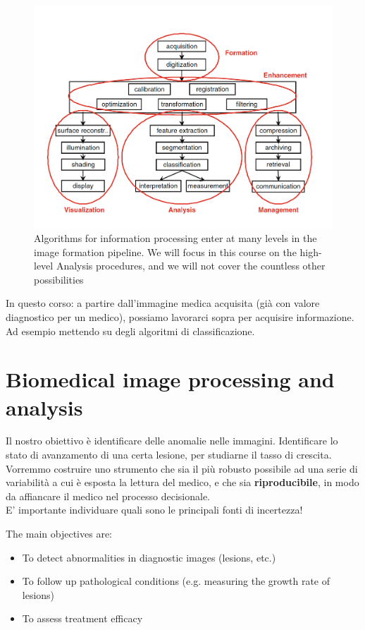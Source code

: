 \begin{figure}[ht]
	\centering
	\includegraphics[width=0.85\linewidth]{figure_med/computers_med_img}
	\caption{Algorithms for
		information processing enter at many levels in the image formation	pipeline. We will focus in this
		course on the high-level Analysis procedures, and
		we will not cover the countless other possibilities}
\end{figure}
\FloatBarrier
In questo corso: a partire dall'immagine medica acquisita (già con valore diagnostico per un medico), possiamo lavorarci sopra per acquisire informazione. Ad esempio mettendo su degli algoritmi di classificazione.\\

\section{Biomedical image processing and analysis}

Il nostro obiettivo è identificare delle anomalie nelle immagini. Identificare lo stato di avanzamento di una certa lesione, per studiarne il tasso di crescita.\\
Vorremmo costruire uno strumento che sia il più robusto possibile ad una serie di variabilità a cui è esposta la lettura del medico, e che sia \textbf{riproducibile}, in modo da affiancare il medico nel processo decisionale.\\
E' importante individuare quali sono le principali fonti di incertezza!

The main objectives are:
\begin{itemize}
	\item To detect abnormalities in diagnostic images (lesions, etc.)
	\item To follow up pathological conditions (e.g. measuring the growth rate of lesions)
	\item To assess treatment efficacy
\end{itemize}

